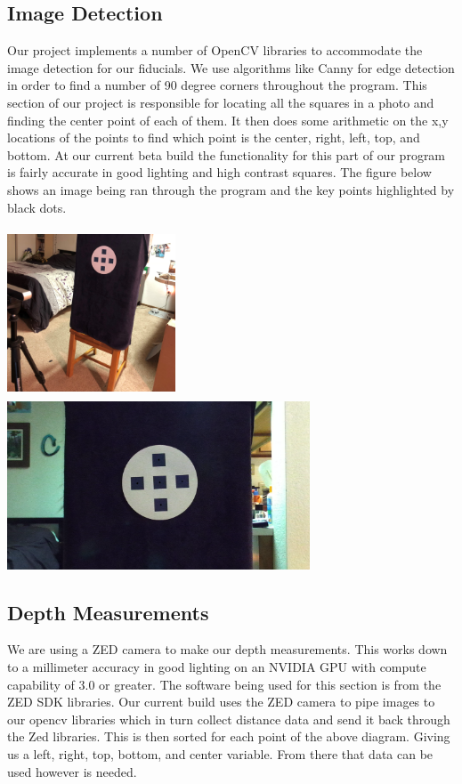 \documentclass[onecolumn, draftclsnofoot,10pt, compsoc]{IEEEtran}
\begin{document}
\subsection{Image Detection}
Our project implements a number of OpenCV libraries to accommodate the image detection for our fiducials.  We use algorithms like Canny for edge detection in order to find a number of 90 degree corners throughout the program.  This section of our project is responsible for locating all the squares in a photo and finding the center point of each of them.  It then does some arithmetic on the x,y locations of the points to find which point is the center, right, left, top, and bottom.  At our current beta build the functionality for this part of our program is fairly accurate in good lighting and high contrast squares.  The figure below shows an image being ran through the program and the key points highlighted by black dots. 

\newline \newline
\includegraphics[width=5cm, height=5cm]{images/image1.jpeg}
\includegraphics[width=9cm, height=5cm]{images/sample.PNG}

\subsection{Depth Measurements}
We are using a ZED camera to make our depth measurements.  This works down to a millimeter accuracy in good lighting on an NVIDIA GPU with compute capability of 3.0 or greater.  The software being used for this section is from the ZED SDK libraries. Our current build uses the ZED camera to pipe images to our opencv libraries which in turn collect distance data and send it back through the Zed libraries. This is then sorted for each point of the above diagram. Giving us a left, right, top, bottom, and center variable. From there that data can be used however is needed.
\end{document}

